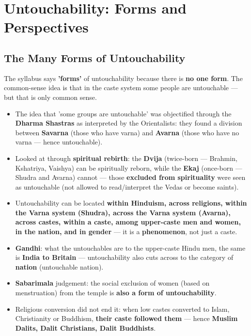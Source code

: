 \chapter{Untouchability: Forms and Perspectives}

\section{The Many Forms of Untouchability}

The syllabus says \textbf{'forms'} of untouchability because there is \textbf{no one form}. The common-sense idea is that in the caste system some people are untouchable --- but that is only common sense.

\begin{KeyConcept}
\begin{itemize}
\item The idea that 'some groups are untouchable' was objectified through the \textbf{Dharma Shastras} as interpreted by the Orientalists: they found a division between \textbf{Savarna} (those who have varna) and \textbf{Avarna} (those who have no varna --- hence untouchable).
\item Looked at through \textbf{spiritual rebirth}: the \textbf{Dvija} (twice-born --- Brahmin, Kshatriya, Vaishya) can be spiritually reborn, while the \textbf{Ekaj} (once-born --- Shudra and Avarna) cannot --- those \textbf{excluded from spirituality} were seen as untouchable (not allowed to read/interpret the Vedas or become saints).
\item Untouchability can be located \textbf{within Hinduism, across religions, within the Varna system (Shudra), across the Varna system (Avarna), across castes, within a caste, among upper-caste men and women, in the nation, and in gender} --- it is a \textbf{phenomenon}, not just a caste.
\end{itemize}
\end{KeyConcept}

\begin{KeyConcept}
\begin{itemize}
\item \textbf{Gandhi}: what the untouchables are to the upper-caste Hindu men, the same is \textbf{India to Britain} --- untouchability also cuts across to the category of \textbf{nation} (untouchable nation).
\item \textbf{Sabarimala} judgement: the social exclusion of women (based on menstruation) from the temple is \textbf{also a form of untouchability}.
\item Religious conversion did not end it: when low castes converted to Islam, Christianity or Buddhism, \textbf{their caste followed them} --- hence \textbf{Muslim Dalits, Dalit Christians, Dalit Buddhists}.
\end{itemize}
\end{KeyConcept}

